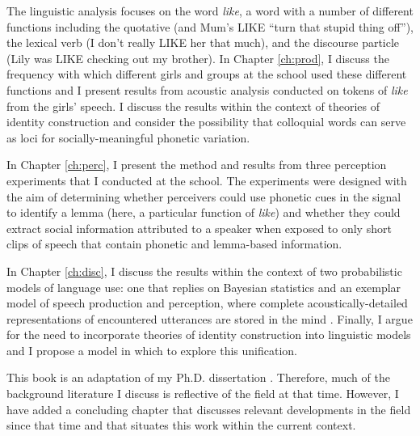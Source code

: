 The linguistic analysis focuses on the word \textit{like}, a word with a number of different functions including the quotative (and Mum's LIKE ``turn that stupid thing off''), the lexical verb (I don't really LIKE her that much), and the discourse particle (Lily was LIKE checking out my brother).  In Chapter \ref{ch:prod}, I discuss the frequency with which different girls and groups at the school used these different functions and I present results from acoustic analysis conducted on tokens of \textit{like} from the girls' speech.  I discuss the results within the context of theories of identity construction and consider the possibility that colloquial words can serve as loci for socially-meaningful phonetic variation.


In Chapter \ref{ch:perc}, I present the method and results from three perception experiments that I conducted at the school.  The experiments were designed with the aim of determining whether perceivers could use phonetic cues in the signal to identify a lemma (here, a particular function of \textit{like}) and whether they could extract social information attributed to a speaker when exposed to only short clips of speech that contain phonetic and lemma-based information.

In Chapter \ref{ch:disc}, I discuss the results within the context of two probabilistic models of language use: one that replies on Bayesian statistics \cite{jurafsky1996,narayananjurafsky2002} and an exemplar model of speech production and perception, where complete acoustically-detailed representations of encountered utterances are stored in the mind \cite{johnson1997,pierrehumbert2001}.  Finally, I argue for the need to incorporate theories of identity construction into linguistic models and I propose a model in which to explore this unification. 


This book is an adaptation of my Ph.D. dissertation \cite{drager2009-thesis}.  Therefore, much of the background literature I discuss is reflective of the field at that time.  However, I have added a concluding chapter that discusses relevant developments in the field since that time and that situates this work within the current context.


